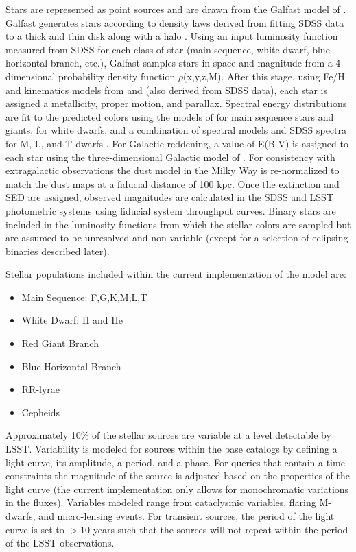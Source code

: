 \documentclass[]{article}
\begin{document}
{Stars are represented as point sources and are drawn from the Galfast model of \citep{galfast}.  
Galfast generates stars according to
density laws  derived from fitting SDSS data
to a thick and thin disk along with a halo \citep{juric}. Using an 
input luminosity function measured from SDSS for each class of star 
(main sequence, white dwarf, blue horizontal branch, etc.), Galfast samples stars in space and magnitude 
from a 4-dimensional probability density function
$\rho$(x,y,z,M). After this stage, using Fe/H and kinematics models
from \citet{ivezic08} and \citet{bond09} (also derived from SDSS data), 
each star is assigned a metallicity, proper motion, and parallax.
Spectral energy distributions are fit to the predicted
colors using the models of \citet{kuruczCD} for main sequence
stars and giants, \citet{bergeron95} for white dwarfs,
and a combination of spectral models and SDSS spectra for M, L, and T
dwarfs 
\citep[e.g.][]{cushing05,bochanski07,burrows06,pettersen89,kowalski10}. 
For Galactic reddening, a value of E(B-V) is assigned to each
star using the three-dimensional Galactic model of 
\citet{amores05}. For consistency with extragalactic observations the
dust model in the Milky Way is re-normalized to match the 
\citet{schlegel98} dust maps at a fiducial distance of 100 kpc.  Once the 
extinction and SED are assigned, observed magnitudes are calculated in
the SDSS and LSST photometric systems using fiducial system throughput curves.
Binary stars are included in the luminosity functions from which the
stellar colors are sampled but are assumed to be unresolved and
non-variable (except for a selection of eclipsing binaries described
later).

Stellar  populations included within the current implementation of the model are:
\begin{itemize}
\item Main Sequence: F,G,K,M,L,T
\item White Dwarf: H and He
\item Red Giant Branch
\item Blue Horizontal Branch
\item RR-lyrae
\item Cepheids
\end{itemize}

Approximately 10\% of the stellar sources are variable at a level detectable
by LSST.
Variability is modeled for sources within the base catalogs
by defining a light curve, its amplitude, a period, and a phase. For
queries that contain a time constraints the magnitude of the source is
adjusted based on the properties of the light curve (the current
implementation only allows for monochromatic variations in the
fluxes). Variables modeled range from cataclysmic variables, flaring
M-dwarfs, and micro-lensing events. For transient sources, the period
of the light curve is set to $>10$ years such that the sources will
not repeat within the period of the LSST observations.


}
\end{document}
